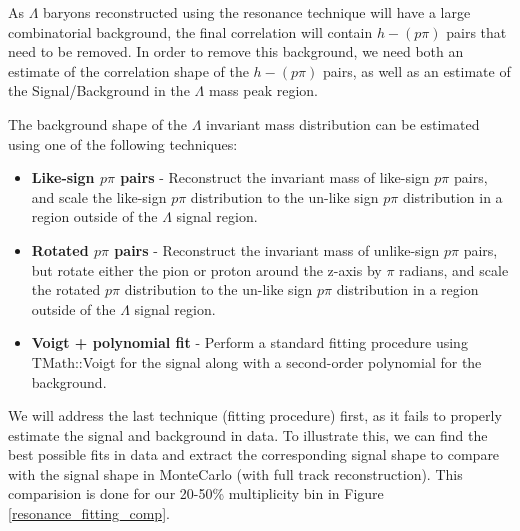 \documentclass[ALICE,manyauthors]{ALICE_analysis_notes}
\begin{document}
\begin{itemize}
As $\Lambda$ baryons reconstructed using the resonance technique will have a large combinatorial background, the final correlation will contain $h-(p\pi)$ pairs that need to be removed. In order to remove this background, we need both an estimate of the correlation shape of the $h-(p\pi)$ pairs, as well as an estimate of the Signal/Background in the $\Lambda$ mass peak region.

 The background shape of the $\Lambda$ invariant mass distribution can be estimated using one of the following techniques:

 \begin{itemize}
	\item \textbf{Like-sign $p\pi$ pairs} - Reconstruct the invariant mass of like-sign $p\pi$ pairs, and scale the like-sign $p\pi$ distribution to the un-like sign $p\pi$ distribution in a region outside of the $\Lambda$ signal region.
	\item \textbf{Rotated $p\pi$ pairs} - Reconstruct the invariant mass of unlike-sign $p\pi$ pairs, but rotate either the pion or proton around the z-axis by $\pi$ radians, and scale the rotated $p\pi$ distribution to the un-like sign $p\pi$ distribution in a region outside of the $\Lambda$ signal region.
	\item \textbf{Voigt + polynomial fit} - Perform a standard fitting procedure using TMath::Voigt for the signal along with a second-order polynomial for the background.
 \end{itemize}

We will address the last technique (fitting procedure) first, as it fails to properly estimate the signal and background in data. To illustrate this, we can find the best possible fits in data and extract the corresponding signal shape to compare with the signal shape in MonteCarlo (with full track reconstruction). This comparision is done for our 20-50\% multiplicity bin in Figure \ref{resonance_fitting_comp}.


\end{itemize}
\end{document}

